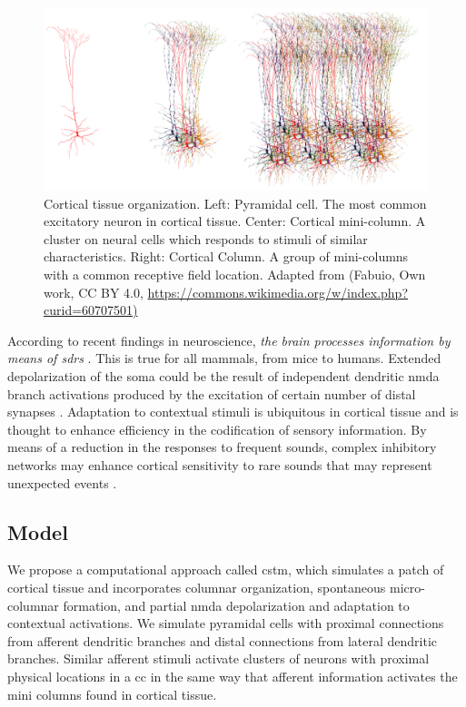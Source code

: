 \documentclass[10pt,letterpaper]{article}
\begin{document}
\begin{figure}[h!]
    \centering
    \includegraphics[width=1.0\textwidth]{Biological.png}
    \caption{Cortical tissue organization. Left: Pyramidal cell. The most common excitatory neuron in cortical tissue.
    Center: Cortical mini-column. A cluster on neural cells which responds to stimuli of similar characteristics.
    Right: Cortical Column. A group of mini-columns with a common receptive field location.
    Adapted from (Fabuio, Own work, CC BY 4.0, \url{https://commons.wikimedia.org/w/index.php?curid=60707501)}}
    \label{fig:Biological}
\end{figure}

According to recent findings in neuroscience,
\emph{the brain processes information by means of \glspl{sdr}}
\cite{barth_2012}.
This is true for all mammals, from mice to humans. Extended depolarization of the soma could be the result of independent dendritic \gls{nmda} branch activations produced by the excitation of certain number of distal synapses \cite{antic_2010, major_2013}. Adaptation to contextual stimuli is ubiquitous in cortical tissue and is thought to enhance efficiency in the codification of sensory information. By means of a reduction in the responses to frequent sounds, complex inhibitory networks may enhance cortical sensitivity to rare sounds that may represent unexpected events \cite{Natan2015ComplementaryCO,nachum_2003,Javitt11962}.

\subsection*{Model}
We propose a computational approach called \gls{cstm}, which simulates a patch of cortical tissue and incorporates columnar organization, spontaneous micro-columnar formation, and partial \gls{nmda} depolarization and adaptation to contextual activations. We simulate pyramidal cells with proximal connections from afferent dendritic branches and distal connections from lateral dendritic branches. Similar afferent stimuli activate clusters of neurons with proximal physical locations in a \gls{cc} in the same way that afferent information activates the mini columns found in cortical tissue.
\end{document}
